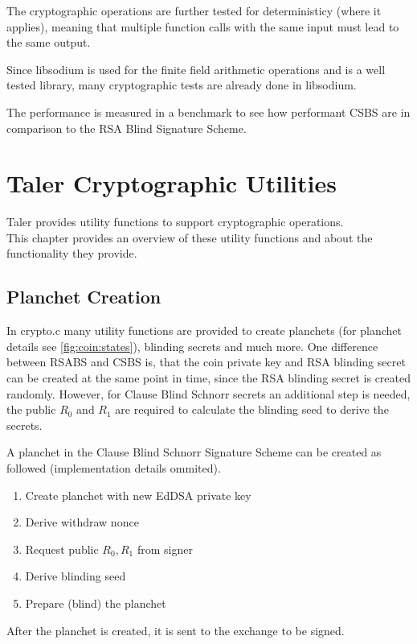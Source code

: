 The cryptographic operations are further tested for deterministicy (where it applies), meaning that multiple function calls with the same input must lead to the same output.

Since libsodium is used for the finite field arithmetic operations and is a well tested library, many cryptographic tests are already done in libsodium.

The performance is measured in a benchmark to see how performant \gls{CSBS} are in comparison to the RSA Blind Signature Scheme.

\section{Taler Cryptographic Utilities}
Taler provides utility functions to support cryptographic operations.\\
This chapter provides an overview of these utility functions and about the functionality they provide.

\subsection{Planchet Creation}
In crypto.c many utility functions are provided to create planchets (for planchet details see \ref{fig:coin:states}), blinding secrets and much more.
One difference between \gls{RSABS} and \gls{CSBS} is, that the coin private key and RSA blinding secret can be created at the same point in time, since the RSA blinding secret is created randomly.
However, for Clause Blind Schnorr secrets an additional step is needed, the public $R_0$ and $R_1$ are required to calculate the blinding seed to derive the secrets.

A planchet in the Clause Blind Schnorr Signature Scheme can be created as followed (implementation details ommited).

\begin{enumerate}
  \item Create planchet with new \ac{EdDSA} private key
  \item Derive withdraw nonce
  \item Request public $R_0, R_1$ from signer
  \item Derive blinding seed
  \item Prepare (blind) the planchet
\end{enumerate}

After the planchet is created, it is sent to the exchange to be signed.

